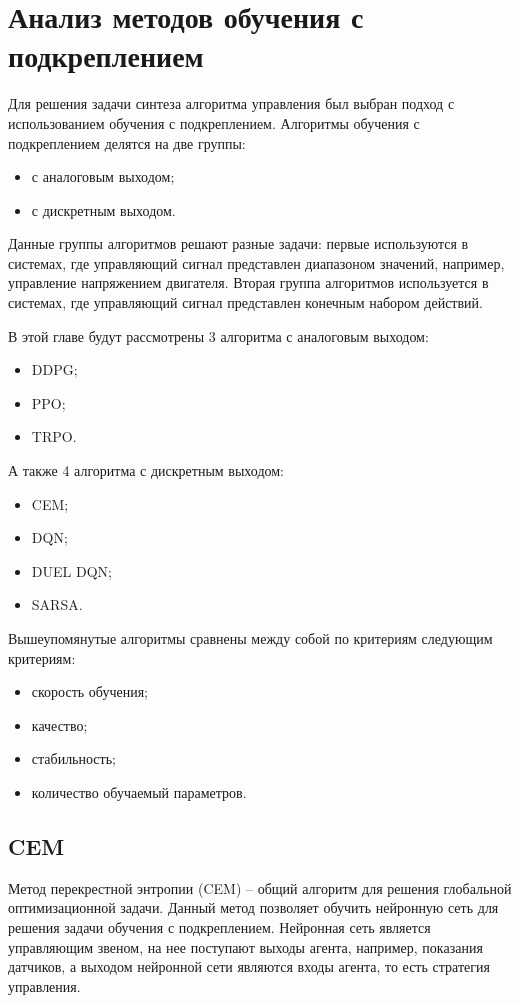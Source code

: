 \section{Анализ методов обучения с подкреплением}
Для решения задачи синтеза алгоритма управления был выбран подход с использованием обучения с подкреплением.
Алгоритмы обучения с подкреплением делятся на две группы:
\begin{itemize}
	\item с аналоговым выходом;
	\item с дискретным выходом.
\end{itemize}

Данные группы алгоритмов решают разные задачи: первые используются в системах, где управляющий сигнал представлен диапазоном значений, например, управление напряжением двигателя. 
Вторая группа алгоритмов используется в системах, где управляющий сигнал представлен конечным набором действий. 

В этой главе будут рассмотрены 3 алгоритма с аналоговым выходом:
\begin{itemize}
	\item DDPG;
	\item PPO;
	\item TRPO.
\end{itemize}

А также 4 алгоритма с дискретным выходом:
\begin{itemize}
	\item CEM;
	\item DQN;
	\item DUEL DQN;
	\item SARSA.
\end{itemize}

Вышеупомянутые алгоритмы сравнены между собой по критериям следующим критериям:
\begin{itemize}
	\item скорость обучения;
	\item качество;
	\item стабильность;
	\item количество обучаемый параметров.
\end{itemize}

\subsection{CEM}

Метод перекрестной энтропии (CEM) -- общий алгоритм для решения глобальной оптимизационной задачи. 
Данный метод позволяет обучить нейронную сеть для решения задачи обучения с подкреплением. 
Нейронная сеть является управляющим звеном, на нее поступают выходы агента, например, показания датчиков, а выходом нейронной сети являются входы агента, то есть стратегия управления.

